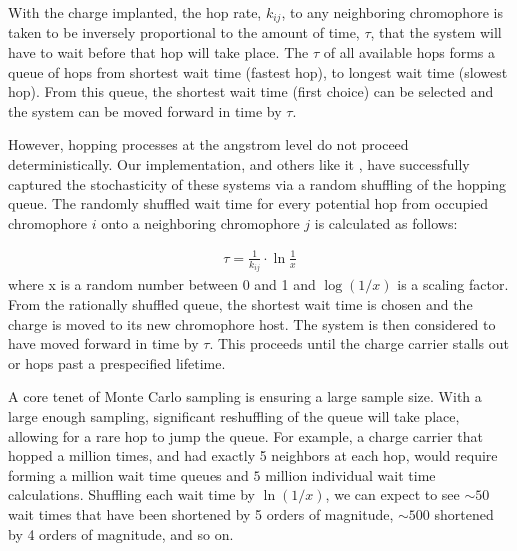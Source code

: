 With the charge implanted, the hop rate, $k_{ij}$, to any
neighboring chromophore is taken to be
inversely proportional to the amount of time, $\tau$, that the system will have to wait before that hop will
take place. The $\tau$ of all available hops forms a queue of hops from
shortest wait time (fastest hop), to
longest wait time (slowest hop). From this queue, the shortest wait time (first choice) can be selected
and the system can be moved forward in time by $\tau$.

However, hopping processes at the angstrom level do not proceed deterministically. 
Our implementation, and others like it \cite{Gali2017}\cite{Kaiser2018}, have
successfully captured the stochasticity of these systems via a random shuffling
of the hopping queue.
The randomly shuffled wait time for every potential hop from occupied chromophore $i$ onto a
neighboring chromophore $j$ is calculated as follows:

\begin{align}
    \tau = \frac{1}{k_{ij}} \cdot \ln{\frac{1}{x}} 
    \label{waittime}
\end{align}
where x is a random number between 0 and 1 and $\log{(1/x)}$ is a scaling
factor. From the rationally shuffled queue, the shortest wait time is chosen and the charge is moved to
its new chromophore host. The system is then considered to have moved forward in time by $\tau$. This proceeds
until the charge carrier stalls out or hops past a prespecified lifetime. 

A core tenet of Monte Carlo sampling is ensuring a large sample size.
With a large enough sampling, significant reshuffling of the queue will take place, 
allowing for a rare hop to jump the queue. 
For example, a charge carrier that hopped a million times, and had
exactly 5 neighbors at each hop, would require forming a million wait time
queues and $5$ million individual wait time calculations. Shuffling each wait
time by $\ln{(1/x)}$, we can expect to see ${\sim}50$ wait times that have been
shortened by 5 orders of magnitude, ${\sim}500$ shortened by 4 orders of magnitude, and so
on.


